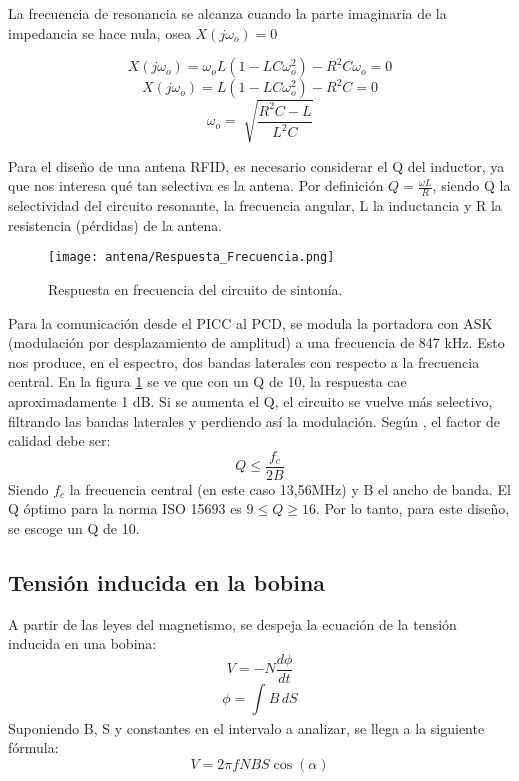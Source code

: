 La frecuencia de resonancia se alcanza cuando la parte imaginaria de la impedancia se
hace nula, osea $X(j\omega _o) = 0$

$$X(j\omega _o) = \omega _o L(1 - LC\omega _o ^2)-R^2C\omega _o = 0$$
$$X(j\omega _o) = L(1 - LC\omega _o ^2)-R^2C = 0$$
\begin{equation}
\boxed{\omega _o = \sqrt[]{\frac{R ^2C - L}{L^2C}}}
\end{equation}

Para el diseño de una antena RFID, es necesario considerar el Q del inductor, ya que nos
interesa qué tan selectiva es la antena. Por definición $Q = \frac{\omega L}{R}$, siendo Q la selectividad del circuito resonante, \omega la frecuencia angular, L la inductancia y R la resistencia (pérdidas) de la antena.

\begin{figure}[H]
\centering
\texttt{[image: antena/Respuesta\_Frecuencia.png]}
\caption{Respuesta en frecuencia del circuito de sintonía.}
\label{fig:transf_frec}
\end{figure}

Para la comunicación desde el PICC al PCD, se modula la portadora con ASK (modulación por desplazamiento de amplitud) a una frecuencia de 847 kHz. Esto nos produce, en el espectro, dos bandas laterales con respecto a la frecuencia central. En la figura \ref{fig:transf_frec} se ve que con un Q de 10, la respuesta cae aproximadamente 1 dB.
Si se aumenta el Q, el circuito se vuelve más selectivo, filtrando las bandas laterales y perdiendo así la modulación. 
Según \cite{antena_guide}, el factor de calidad debe ser:
\begin{equation}
\boxed{Q \leq \frac{f_c}{2B}}
\end{equation}
Siendo $f_c$ la frecuencia central (en este caso 13,56MHz) y B el ancho de banda. El Q
óptimo para la norma ISO 15693 es $9\leq Q\geq 16$.
Por lo tanto, para este diseño, se escoge un Q de 10.

\subsection{Tensión inducida en la bobina}
A partir de las leyes del magnetismo, se despeja la ecuación de la tensión inducida en una bobina:
\begin{equation}
V = -N\frac{d\phi}{dt}
\end{equation}
\begin{equation}
\phi = \int_{}^{}  B \, dS
\end{equation}
Suponiendo B, S y \psi constantes en el intervalo a analizar, se llega a la siguiente fórmula:
\begin{equation}
\boxed{V = 2 \pi fNBS\cos(\alpha)}
\end{equation}

